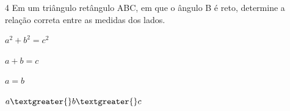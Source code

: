 





\num{4} Em um triângulo retângulo ABC, em que o ângulo B é reto, determine a
relação correta entre as medidas dos lados.

\begin{escolha}
\item $a^2 + b^2 = c^2$
\item $a + b = c$
\item $a = b$
\item $a \textgreater{} b \textgreater{} c$
\end{escolha}






